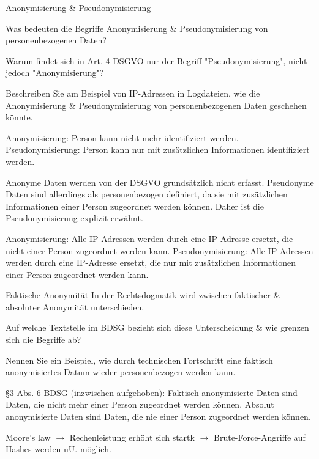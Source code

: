 \documentclass{article}
\begin{document}
\begin{exercises}{Anonymisierung \& Pseudonymisierung}
\item Was bedeuten die Begriffe Anonymisierung \& Pseudonymisierung von personenbezogenen Daten?
\item Warum findet sich in Art. 4 DSGVO nur der Begriff "Pseudonymisierung", nicht jedoch "Anonymisierung"?
\item Beschreiben Sie am Beispiel von IP-Adressen in Logdateien, wie die Anonymisierung \& Pseudonymisierung von personenbezogenen Daten geschehen könnte.
\end{exercises}

\begin{solutions}
  \item Anonymisierung: Person kann nicht mehr identifiziert werden. Pseudonymisierung: Person kann nur mit zusätzlichen Informationen identifiziert werden.
  \item Anonyme Daten werden von der DSGVO grundsätzlich nicht erfasst. Pseudonyme Daten sind allerdings als personenbezogen definiert, da sie mit zusätzlichen Informationen einer Person zugeordnet werden können. Daher ist die Pseudonymisierung explizit erwähnt.
  \item Anonymisierung: Alle IP-Adressen werden durch eine IP-Adresse ersetzt, die nicht einer Person zugeordnet werden kann. Pseudonymisierung: Alle IP-Adressen werden durch eine IP-Adresse ersetzt, die nur mit zusätzlichen Informationen einer Person zugeordnet werden kann.
\end{solutions}

\begin{eexercises}{Faktische Anonymität}{
    In der Rechtsdogmatik wird zwischen faktischer \& absoluter Anonymität unterschieden.
  }
  \item Auf welche Textstelle im BDSG bezieht sich diese Unterscheidung \& wie grenzen sich die Begriffe ab?
  \item Nennen Sie ein Beispiel, wie durch technischen Fortschritt eine faktisch anonymisiertes Datum wieder personenbezogen werden kann.
\end{eexercises}

\begin{solutions}
  \item §3 Abs. 6 BDSG (inzwischen aufgehoben): Faktisch anonymisierte Daten sind Daten, die nicht mehr einer Person zugeordnet werden können. Absolut anonymisierte Daten sind Daten, die nie einer Person zugeordnet werden können.
  \item Moore's law $\to$ Rechenleistung erhöht sich startk $\to$ Brute-Force-Angriffe auf Hashes werden uU. möglich.
\end{solutions}
\end{document}
